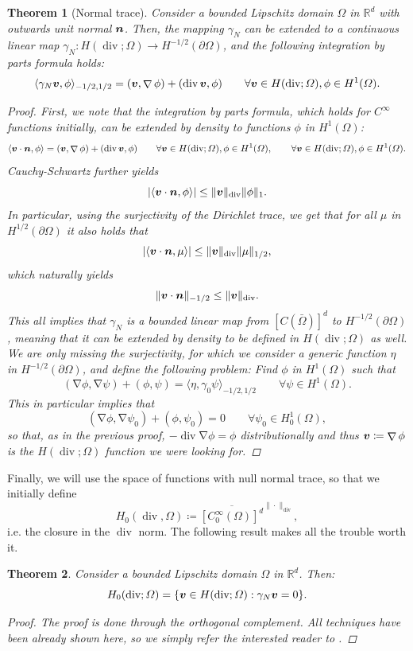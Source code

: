 \documentclass{article}
\renewcommand{\vec}{\vectorsym}
\DeclareMathOperator{\grad}{\nabla}
\DeclareMathOperator{\dive}{\text{div}}
\newcommand{\R}{\mathbb{R}}
\newtheorem{theorem}{Theorem}
\begin{document}
\begin{theorem}[Normal trace]
Consider a bounded Lipschitz domain $\Omega$ in $\R^d$ with outwards unit normal $\vec n$. Then, the mapping $\gamma_N$ can be extended to a continuous linear map $\gamma_N: H(\dive; \Omega) \to H^{-1/2}(\partial\Omega)$, and the following integration by parts formula holds: 
        $$ \langle \gamma_N \vec v, \phi \rangle_{-1/2, 1/2} = (\vec v, \grad \phi) + (\dive \vec v, \phi) \qquad \forall \vec v\in H(\dive;\Omega), \phi \in H^1(\Omega). $$
    \begin{proof}
        First, we note that the integration by parts formula, which holds for $C^\infty$ functions initially, can be extended by density to functions $\phi$ in $H^1(\Omega)$:
        $$ \langle \vec v\cdot \vec n, \phi \rangle = (\vec v, \grad \phi) + (\dive \vec v, \phi) \qquad \forall \vec v\in H(\dive;\Omega), \phi \in H^1(\Omega), \qquad \forall \vec v\in H(\dive;\Omega), \phi \in H^1(\Omega). $$
        Cauchy-Schwartz further yields
            $$ |\langle \vec v\cdot \vec n, \phi\rangle | \leq \| \vec v \|_{\dive} \| \phi \|_1. $$
        In particular, using the surjectivity of the Dirichlet trace, we get that for all $\mu$ in $H^{1/2}(\partial\Omega)$ it also holds that
            $$ |\langle \vec v\cdot \vec n, \mu\rangle | \leq \| \vec v \|_{\dive} \| \mu \|_{1/2}, $$
        which naturally yields
            $$ \| \vec v \cdot \vec n\|_{-1/2} \leq \| \vec v\|_{\dive}. $$
        This all implies that $\gamma_N$ is a bounded linear map from $[C(\bar\Omega)]^d$ to $H^{-1/2}(\partial\Omega)$, meaning that it can be extended by density to be defined in $H(\dive;\Omega)$ as well. We are only missing the surjectivity, for which we consider a generic function $\eta$ in $H^{-1/2}(\partial\Omega)$, and define the following problem: Find $\phi$ in $H^1(\Omega)$ such that
        $$ (\grad \phi, \grad \psi) + (\phi, \psi) = \langle \eta, \gamma_0 \psi \rangle_{-1/2,1/2} \qquad\forall \psi \in H^1(\Omega).$$
        This in particular implies that 
        $$ (\grad \phi, \grad \psi_0) + (\phi, \psi_0) = 0 \qquad\forall \psi_0 \in H_0^1(\Omega),$$
        so that, as in the previous proof, $-\dive \grad \phi = \phi$ distributionally and thus $\vec v \coloneqq \grad \phi$ is the $H(\dive;\Omega)$ function we were looking for.
    \end{proof}
\end{theorem}
Finally, we will use the space of functions with null normal trace, so that we initially define
    $$ H_0(\dive, \Omega) \coloneqq \overline{[C_0^\infty(\Omega)]^d}^{\|\cdot \|_{\dive}}, $$
i.e. the closure in the $\dive$ norm. The following result makes all the trouble worth it. 
\begin{theorem}
    Consider a bounded Lipschitz domain $\Omega$ in $\R^d$. Then: 
        $$ H_0(\dive;\Omega) = \{\vec v\in H(\dive;\Omega): \gamma_N \vec v = 0 \}. $$
    \begin{proof}
        The proof is done through the orthogonal complement. All techniques have been already shown here, so we simply refer the interested reader to \cite[Thm 3.25]{monk2003finite}.
    \end{proof}
\end{theorem}
\end{document}
